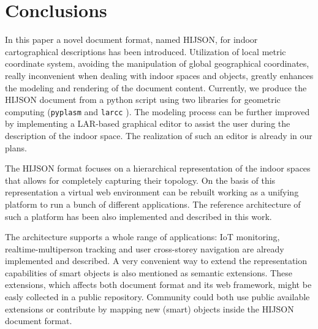 \section{Conclusions}\label{conclusions}

In this paper a novel document format, named HIJSON, for indoor cartographical descriptions has been
introduced. Utilization of local metric coordinate system,
avoiding the manipulation of global geographical coordinates, really inconvenient when
dealing with indoor spaces and objects, greatly enhances the modeling and rendering
of the document content. Currently, we produce the HIJSON document from a python
script using two libraries for geometric computing (\texttt{pyplasm} and \texttt{larcc} \cite{Dicarlo:2014:TNL:2543138.2543294,paoluzziMS:2014,cadanda:2015}).
The modeling process can be further improved by implementing a LAR-based 
graphical editor to assist the user during the description of the indoor
space. The realization of such an editor is already in our plans.

The HIJSON format focuses on a hierarchical representation of the indoor
spaces that allows for completely capturing their topology. On the basis of
this representation a virtual web environment can be rebuilt working as a
unifying platform to run a bunch of different applications. The reference
architecture of such a platform has been also implemented and described in
this work. 

The architecture supports a whole range of applications: IoT monitoring,
realtime-multiperson tracking and user cross-storey navigation are already
implemented and described. A very convenient way to extend the representation
capabilities of smart objects is also mentioned as semantic extensions. These
extensions, which affects both document format and its web framework, might be
easly collected in a public repository. Community could both use public
available extensions or contribute by mapping new (smart) objects inside the
HIJSON document format.
